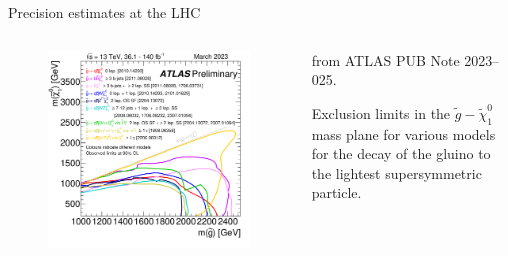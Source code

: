 \begin{frame}{Precision estimates at the LHC}
\begin{columns}
\begin{column}{0.5 \textwidth}
\begin{columns}
\begin{column}{0.5\textwidth}
          \begin{figure}
          \centering
          \includegraphics[width = 1 \textwidth]{imgs/susy.png}
          \end{figure}

        \end{column}

        \hspace{-2em}

        \begin{column}{0.5 \textwidth}

          \scriptsize {} from ATLAS PUB Note 2023--025.

          \justifying
          \scriptsize Exclusion limits in the $ \tilde{g} - \tilde{\chi}^0_1 $ mass plane for various models for the decay of the gluino to the lightest supersymmetric particle.

        \end{column}

      \end{columns}

    \end{column}

  \end{columns}

\end{frame}

